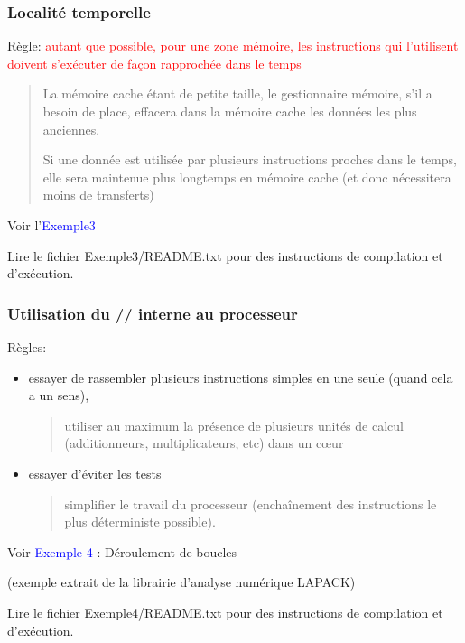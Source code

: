 \documentclass{beamer}
\begin{document}
\begin{frame}
\frametitle{Localit\'e temporelle}
Règle: 
	\textcolor{red}{autant que possible, pour une zone m\'emoire, les instructions qui l'utilisent doivent s'ex\'ecuter de façon rapproch\'ee dans le temps}
	\vfill
	
	\begin{quote}
		La m\'emoire cache \'etant de petite taille, le gestionnaire m\'emoire, s'il a besoin de place, effacera dans la m\'emoire cache les donn\'ees les plus anciennes.
		
		Si une donn\'ee est utilis\'ee par plusieurs instructions proches dans le temps, elle sera maintenue plus longtemps en m\'e\-moi\-re cache (et donc n\'ecessitera moins de transferts)
	\end{quote}

\vfill
Voir l'\textcolor{blue}{Exemple3}

Lire le fichier Exemple3/README.txt pour des instructions de compilation et d'exécution.
\end{frame}

\begin{frame}[fragile]
\frametitle{Utilisation du // interne au processeur}
Règles: 
\begin{itemize}
	\item essayer de rassembler plusieurs instructions simples en une seule (quand cela a un sens),
	\begin{quote}
		utiliser au maximum la pr\'esence de plusieurs unit\'es de calcul (additionneurs, multiplicateurs, etc) dans un c\oe ur
	\end{quote}
	\item  essayer d'\'eviter les tests
	\begin{quote}
		simplifier le travail du processeur (encha\^{i}nement des instructions le plus d\'eterministe possible).
	\end{quote}
\end{itemize}

	Voir \textcolor{blue}{Exemple 4} : Déroulement de boucles

(exemple extrait de la librairie d'analyse numérique LAPACK)


Lire le fichier Exemple4/README.txt pour des instructions de compilation et d'exécution.

\end{frame}
\end{document}
